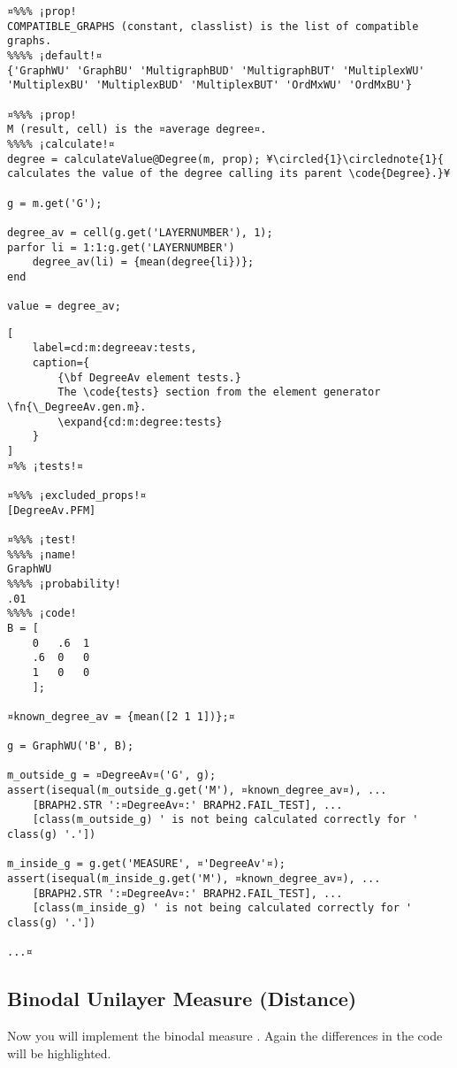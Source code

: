 \documentclass{tufte-handout}
\begin{document}
\begin{lstlisting}
¤%%% ¡prop!
COMPATIBLE_GRAPHS (constant, classlist) is the list of compatible graphs.
%%%% ¡default!¤
{'GraphWU' 'GraphBU' 'MultigraphBUD' 'MultigraphBUT' 'MultiplexWU' 'MultiplexBU' 'MultiplexBUD' 'MultiplexBUT' 'OrdMxWU' 'OrdMxBU'}

¤%%% ¡prop!
M (result, cell) is the ¤average degree¤.
%%%% ¡calculate!¤
degree = calculateValue@Degree(m, prop); ¥\circled{1}\circlednote{1}{ calculates the value of the degree calling its parent \code{Degree}.}¥

g = m.get('G');

degree_av = cell(g.get('LAYERNUMBER'), 1);
parfor li = 1:1:g.get('LAYERNUMBER')
    degree_av(li) = {mean(degree{li})};
end

value = degree_av;
\end{lstlisting}

\begin{lstlisting}[
	label=cd:m:degreeav:tests,
	caption={
		{\bf DegreeAv element tests.}
		The \code{tests} section from the element generator \fn{\_DegreeAv.gen.m}.
		\expand{cd:m:degree:tests}
	}
]
¤%% ¡tests!¤

¤%%% ¡excluded_props!¤
[DegreeAv.PFM]

¤%%% ¡test!
%%%% ¡name!
GraphWU
%%%% ¡probability!
.01
%%%% ¡code!
B = [
    0   .6  1
    .6  0   0
    1   0   0
    ];

¤known_degree_av = {mean([2 1 1])};¤

g = GraphWU('B', B);

m_outside_g = ¤DegreeAv¤('G', g);
assert(isequal(m_outside_g.get('M'), ¤known_degree_av¤), ...
    [BRAPH2.STR ':¤DegreeAv¤:' BRAPH2.FAIL_TEST], ...
    [class(m_outside_g) ' is not being calculated correctly for ' class(g) '.'])

m_inside_g = g.get('MEASURE', ¤'DegreeAv'¤);
assert(isequal(m_inside_g.get('M'), ¤known_degree_av¤), ...
    [BRAPH2.STR ':¤DegreeAv¤:' BRAPH2.FAIL_TEST], ...
    [class(m_inside_g) ' is not being calculated correctly for ' class(g) '.'])

...¤
\end{lstlisting}

\clearpage
\subsection{Binodal Unilayer Measure (Distance)}

Now you will implement the binodal measure . 
{%
Again the differences in the code will be highlighted.
}%
\end{document}
